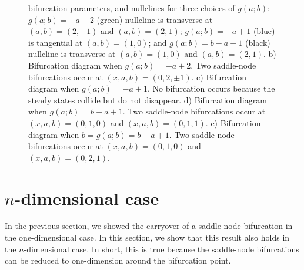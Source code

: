 \documentclass[12pt]{article}
\begin{document}
\begin{figure}
     \ContinuedFloat
     \caption{bifurcation parameters, and nullclines for three choices of $g(a;b)$: $g(a;b)=-a+2$ (green) nullcline is transverse at $(a,b)=(2,-1)$ and $(a,b)=(2,1)$; $g(a;b)= -a+1$ (blue) is tangential at $(a,b)=(1,0)$; and $g(a;b)=b-a+1$ (black) nullcline is transverse at $(a,b)=(1,0)$ and $(a,b)=(2,1)$. b) Bifurcation diagram when $g(a;b)=-a+2$. Two saddle-node bifurcations occur at $(x,a,b)=(0,2,\pm1)$. c) Bifurcation diagram when $g(a;b)=-a+1$. No bifurcation occurs because the steady states collide but do not disappear. d) Bifurcation diagram when $g(a;b)=b-a+1$. Two saddle-node bifurcations occur at $(x,a,b)=(0,1,0)$ and $(x,a,b)=(0,1,1)$. e) Bifurcation diagram when $\dot b = g(a;b)=b-a+1$. Two saddle-node bifurcations occur at $(x,a,b)=(0,1,0)$ and $(x,a,b)=(0,2,1)$. }
\end{figure}


\section{$n$-dimensional case}
\label{sec:NDCase}


In the previous section, we showed the carryover of a saddle-node bifurcation in the one-dimensional case. In this section, we show that this result also holds in the $n$-dimensional case. In short, this is true because the saddle-node bifurcations can be reduced to one-dimension around the bifurcation point.
\end{document}
